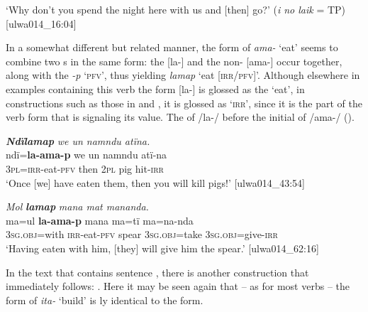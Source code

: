 \glt `Why don’t you spend the night here with us and [then] go?’ (\textit{i no laik} = TP) [ulwa014\_16:04]
\z

In a somewhat different but related manner, the   form of \textit{ama-} ‘eat’ seems to combine two s in the same form: the   [la-] and the non-  [ama-] occur together, along with the   \textit{{}-p} ‘\textsc{pfv}’, thus yielding \textit{lamap} ‘eat [\textsc{irr/pfv]}’. Although elsewhere in examples containing this verb the form [la-] is glossed as the  ‘eat’, in   constructions such as those in  and , it is glossed as ‘\textsc{irr}’, since it is the part of the verb form that is signaling its  value. The  of /la-/  before the initial  of /ama-/ ().

\ea%
    \label{ex:verbs:62}

          \textbf{\textit{Ndïlamap}} \textit{we un namndu atïna.}\\
\gll    ndï=\textbf{la{}-ama-p} we    un  namndu   atï-na\\
    3\textsc{pl}=\textsc{irr}{}-eat-\textsc{pfv}  then  2\textsc{pl}  pig      hit-\textsc{irr}\\
\glt `Once [we] have eaten them, then you will kill pigs!’ [ulwa014\_43:54]
\z

\ea%
    \label{ex:verbs:63}
          \textit{Mol} \textbf{\textit{lamap}} \textit{mana mat mananda.}\\
\gll    ma=ul       \textbf{la{}-ama-p} mana  ma=tï    ma=na-nda\\
    3\textsc{sg.obj}=with  \textsc{irr}{}-eat-\textsc{pfv}  spear  \textsc{3sg.obj}=take    \textsc{3sg.obj}=give-\textsc{irr}\\


\glt `Having eaten with him, [they] will give him the spear.’ [ulwa014\_62:16]
\z

In the text that contains sentence , there is another   construction that immediately follows: . Here it may be seen again that -- as for most verbs -- the   form of \textit{ita-} ‘build’ is ly identical to the  form.


